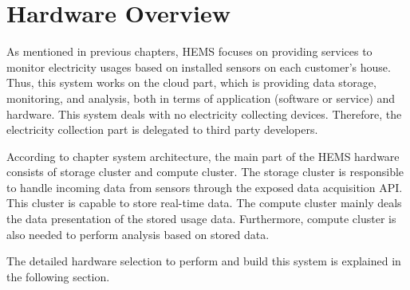 \section{Hardware Overview}
\label{sec:hardware-overview}
As mentioned in previous chapters, HEMS focuses on providing services to monitor electricity usages based on installed sensors on each customer's house. Thus, this system works on the cloud part, which is providing data storage, monitoring, and analysis, both in terms of application (software or service) and hardware. This system deals with no electricity collecting devices. Therefore, the electricity collection part is delegated to third party developers.

According to chapter system architecture, the main part of the HEMS hardware consists of storage cluster and compute cluster. The storage cluster is responsible to handle incoming data from sensors through the exposed data acquisition API. This cluster is capable to store real-time data. The compute cluster mainly deals the data presentation of the stored usage data. Furthermore, compute cluster is also needed to perform analysis based on stored data.

The detailed hardware selection to perform and build this system is explained in the following section.




